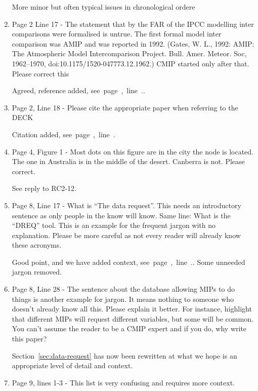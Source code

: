 \documentclass[gmd,manuscript]{copernicus}
\newcommand{\plref}[1]{\mbox{see page \pageref{p-#1}, line
    \lineref{l-#1}.}}
\newenvironment{answer}{\color{blue}}{}
\begin{document}
\begin{enumerate}[label=RC3-\arabic*,leftmargin=*]
  More minor but often typical issues in chronological ordere
\item Page 2 Line 17 - The statement that by the FAR of the IPCC
  modelling inter comparisons were formalised is untrue. The first
  formal model inter comparison was AMIP and was reported in 1992.
  (Gates, W. L., 1992: AMIP: The Atmospheric Model Intercomparison
  Project. Bull. Amer. Meteor. Soc, 1962--1970,
  doi:10.1175/1520-047773.12.1962.) CMIP started only after that.
  Please correct this

  \begin{answer}
    Agreed, reference added, \plref{RC1-6}.
  \end{answer}
\item Page 2, Line 18 - Please cite the appropriate paper when
  referring to the DECK

  \begin{answer}
    Citation added, \plref{RC2-7}
  \end{answer}
\item Page 4, Figure 1 - Most dots on this figure are in the city the
  node is located. The one in Australia is in the middle of the
  desert. Canberra is not. Please correct.

  \begin{answer}
    See reply to RC2-12.
  \end{answer}
\item Page 8, Line 17 - What is “The data request”. This needs an
  introductory sentence as only people in the know will know. Same
  line: What is the “DREQ” tool. This is an example for the frequent
  jargon with no explanation. Please be more careful as not every
  reader will already know these acronyms.

  \begin{answer}
    Good point, and we have added context, \plref{RC2-18}. Some
    unneeded jargon removed.
  \end{answer}
\item Page 8, Line 28 - The sentence about the database allowing MIPs
  to do things is another example for jargon. It means nothing to
  someone who doesn’t already know all this. Please explain it better.
  For instance, highlight that different MIPs will request different
  variables, but some will be common. You can’t assume the reader to
  be a CMIP expert and if you do, why write this paper?

  \begin{answer}
    Section~\ref{sec:data-request} has now been rewritten at what we
    hope is an appropriate level of detail and context.
  \end{answer}
\item Page 9, lines 1-3 - This list is very confusing and requires
  more context.


\end{enumerate}
\end{document}
